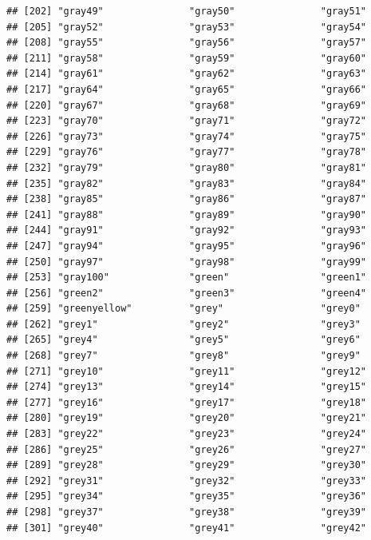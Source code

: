 \documentclass[]{book}
\begin{document}
\begin{verbatim}
## [202] "gray49"               "gray50"               "gray51"              
## [205] "gray52"               "gray53"               "gray54"              
## [208] "gray55"               "gray56"               "gray57"              
## [211] "gray58"               "gray59"               "gray60"              
## [214] "gray61"               "gray62"               "gray63"              
## [217] "gray64"               "gray65"               "gray66"              
## [220] "gray67"               "gray68"               "gray69"              
## [223] "gray70"               "gray71"               "gray72"              
## [226] "gray73"               "gray74"               "gray75"              
## [229] "gray76"               "gray77"               "gray78"              
## [232] "gray79"               "gray80"               "gray81"              
## [235] "gray82"               "gray83"               "gray84"              
## [238] "gray85"               "gray86"               "gray87"              
## [241] "gray88"               "gray89"               "gray90"              
## [244] "gray91"               "gray92"               "gray93"              
## [247] "gray94"               "gray95"               "gray96"              
## [250] "gray97"               "gray98"               "gray99"              
## [253] "gray100"              "green"                "green1"              
## [256] "green2"               "green3"               "green4"              
## [259] "greenyellow"          "grey"                 "grey0"               
## [262] "grey1"                "grey2"                "grey3"               
## [265] "grey4"                "grey5"                "grey6"               
## [268] "grey7"                "grey8"                "grey9"               
## [271] "grey10"               "grey11"               "grey12"              
## [274] "grey13"               "grey14"               "grey15"              
## [277] "grey16"               "grey17"               "grey18"              
## [280] "grey19"               "grey20"               "grey21"              
## [283] "grey22"               "grey23"               "grey24"              
## [286] "grey25"               "grey26"               "grey27"              
## [289] "grey28"               "grey29"               "grey30"              
## [292] "grey31"               "grey32"               "grey33"              
## [295] "grey34"               "grey35"               "grey36"              
## [298] "grey37"               "grey38"               "grey39"              
## [301] "grey40"               "grey41"               "grey42"              

\end{verbatim}
\end{document}
